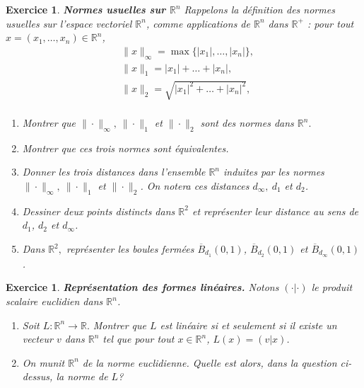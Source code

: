 \documentclass[11pt,a4paper]{article}
\newcommand{\R}{\mathbb{R}}
\newcounter{ex}
\newtheorem{exs}[ex]{Exercice}
\newenvironment{exo}{\begin{exs}\rm}{\end{exs}\vspace{.1cm}}
\begin{document}
\begin{exo}\textbf{Normes usuelles sur $\R^n$} Rappelons la définition des normes usuelles sur l'espace vectoriel $\R^n$, comme applications de $\R^n$ dans $\R^+$ : pour tout $x=(x_1,\dots,x_n)\in\R^n$,
\begin{align*}
&\|x\|_{\infty}=\max\{|x_1|,\dots,|x_n|\}, \\
&\|x\|_{1}=|x_1|+\dots+|x_n|,\\
&\|x\|_{2}=\sqrt{|x_1|^2+\dots+|x_n|^2},\\
\end{align*}
\begin{enumerate}
\item Montrer que $\|\cdot\|_{\infty},\ \|\cdot\|_{1}$ et $\|\cdot\|_{2}$ sont des normes dans $\R^n.$
\item Montrer que ces trois normes sont équivalentes. 
\item Donner les trois distances dans l'ensemble $\R^n$ induites par les normes $\|\cdot\|_{\infty},\ \|\cdot\|_{1}$ 
et $\|\cdot\|_{2}$. On notera ces distances $d_{\infty},\ d_1$ et $d_2$.
\item Dessiner deux points distincts dans $\R^2$ et représenter leur distance au sens de $d_1$, $d_2$ et $d_\infty$. 
\item Dans $\R^2,$ représenter les boules fermées $\overline{B}_{d_1}(0,1)$, $\overline{B}_{d_2}(0,1)$ et $\overline{B}_{d_\infty}(0,1)$. 
\end{enumerate}
\end{exo}
\begin{exo}\textbf{Représentation des formes linéaires.}
Notons $(\cdot|\cdot)$ le produit scalaire euclidien dans $\R^n$. 
\begin{enumerate}
    \item Soit $L:\R^n\longrightarrow\R.$ Montrer que $L$ est linéaire \textit{si et seulement si} il existe un vecteur $v$ dans $\R^n$ tel que pour tout $x\in\R^n$, $L(x)=(v|x)$.
     \item On munit $\R^n$ de la norme euclidienne. Quelle est alors, dans la question ci-dessus, la norme de $L$?
\end{enumerate}
\end{exo}
\end{document}
